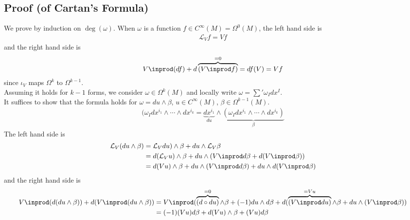 \documentclass[11pt]{article}
\begin{document}
\subsection*{Proof (of Cartan's Formula)}
\label{sec:org8e49192}
We prove by induction on \(\operatorname{deg}(\omega)\). When \(\omega\) is a function \(f\in C^{\infty}(M)=\Omega^{0}(M)\), the left hand side is\\
\begin{align*}
  \mathcal{L}_{V}f=Vf
\end{align*}
and the right hand side is\\
\begin{align*}
  V\inprod(df)+d\overbrace{(V\inprod f)}^{=0}
  =df(V)=Vf
\end{align*}
since \(\iota_{V}\) maps \(\Omega^{k}\) to \(\Omega^{k-1}\).\\
Assuming it holds for \(k-1\) forms, we consider \(\omega\in\Omega^{k}(M)\) and locally write \(\omega=\sum'\omega_{I}dx^{I}\).\\
It suffices to show that the formula holds for \(\omega=du\wedge\beta\), \(u\in C^{\infty}(M)\), \(\beta\in\Omega^{k-1}(M)\).\\
\begin{align*}
  (\omega_{I}dx^{i_{1}}\wedge\cdots\wedge dx^{i_{k}}
  =\underbrace{dx^{i_{1}}}_{du}\wedge\underbrace{(\omega_{I}dx^{i_{1}}\wedge\cdots\wedge dx^{i_{k}})}_{\beta}
\end{align*}
The left hand side is\\
\begin{align*}
  \mathcal{L}_{V}(du\wedge\beta)
  &=\mathcal{L}_{V}du)\wedge\beta+du\wedge\mathcal{L}_{V}\beta \\
  &=d(\mathcal{L}_{V}u)\wedge\beta+du\wedge(V\inprod d\beta+d(V\inprod\beta)) \\
  &=d(Vu)\wedge\beta+du\wedge(V\inprod d\beta)+du\wedge d(V\inprod\beta)
\end{align*}
and the right hand side is\\
\begin{align*}
  V\inprod(d(du\wedge\beta))+d(V\inprod(du\wedge\beta))
  &=V\inprod(\overbrace{(d\circ du)}^{=0}\wedge\beta+(-1)du\wedge d\beta+d(\overbrace{(V\inprod du)}^{=Vu}\wedge\beta+du\wedge(V\inprod\beta)) \\
  &=(-1)(Vu)d\beta+d(Vu)\wedge\beta+(Vu)d\beta
\end{align*}
\end{document}
